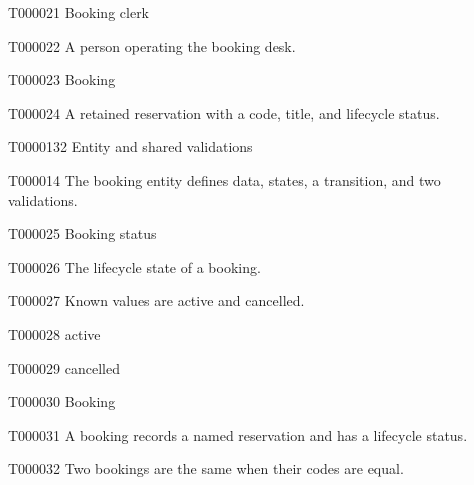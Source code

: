 \documentclass[11pt,a4paper]{article}
\begin{document}
\begin{atlastext}{T000021}
Booking clerk
\end{atlastext}
\begin{atlasparagraph}{T000022}
A person operating the booking desk.
\end{atlasparagraph}
\begin{atlastext}{T000023}
Booking
\end{atlastext}
\begin{atlasparagraph}{T000024}
A retained reservation with a code, title, and lifecycle status.
\end{atlasparagraph}
\begin{atlasheading}{T000013}{2}
Entity and shared validations
\end{atlasheading}
\begin{atlasparagraph}{T000014}
The booking entity defines data, states, a transition, and two validations.
\end{atlasparagraph}
\begin{atlastext}{T000025}
Booking status
\end{atlastext}
\begin{atlasparagraph}{T000026}
The lifecycle state of a booking.
\end{atlasparagraph}
\begin{atlasparagraph}{T000027}
Known values are active and cancelled.
\end{atlasparagraph}
\begin{atlasitem}{T000028}
active
\end{atlasitem}
\begin{atlasitem}{T000029}
cancelled
\end{atlasitem}
\begin{atlastext}{T000030}
Booking
\end{atlastext}
\begin{atlasparagraph}{T000031}
A booking records a named reservation and has a lifecycle status.
\end{atlasparagraph}
\begin{atlasparagraph}{T000032}
Two bookings are the same when their codes are equal.
\end{atlasparagraph}
\end{document}
